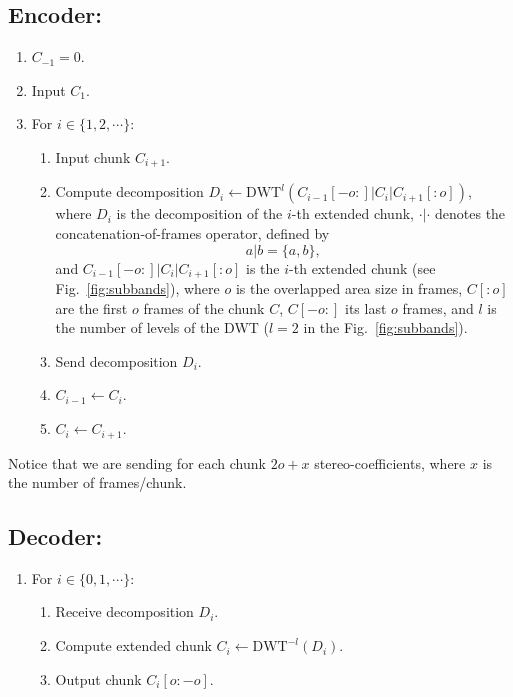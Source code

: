 \subsection*{Encoder:}
\begin{enumerate}
\item $C_{-1}=0$.
\item Input $C_1$.
\item For $i\in\{1,2,\cdots\}$:   
  \begin{enumerate}               
  \item Input chunk $C_{i+1}$.
  \item Compute decomposition $D_i \leftarrow
    \text{DWT}^l(C_{i-1}[-o:]|C_i|C_{i+1}[:o])$, where $D_i$ is the
    decomposition of the $i$-th extended chunk, $\cdot|\cdot$ denotes
    the concatenation-of-frames operator, defined by
    \begin{equation}
      a|b = \{a,b\},
    \end{equation}
    and $C_{i-1}[-o:]|C_i|C_{i+1}[:o]$ is the $i$-th extended chunk
    (see Fig.~\ref{fig:subbands}), where $o$ is the overlapped area
    size in frames, $C[:o]$ are the first $o$ frames of the chunk $C$,
    $C[-o:]$ its last $o$ frames, and $l$ is the number of levels of
    the DWT ($l=2$ in the Fig.~\ref{fig:subbands}).
  \item Send decomposition $D_i$.
  \item $C_{i-1}\leftarrow C_i$.
  \item $C_i\leftarrow C_{i+1}$.
  \end{enumerate}
\end{enumerate}

Notice that we are sending for each chunk $2o+x$ stereo-coefficients, where
$x$ is the number of frames/chunk.

\subsection*{Decoder:}
\begin{enumerate}
\item For $i\in\{0,1,\cdots\}$:
  \begin{enumerate}
  \item Receive decomposition $D_i$.
  \item Compute extended chunk $C_i\leftarrow\text{DWT}^{-l}(D_i)$.
  \item Output chunk $C_i[o:-o]$.
  \end{enumerate}
\end{enumerate}

